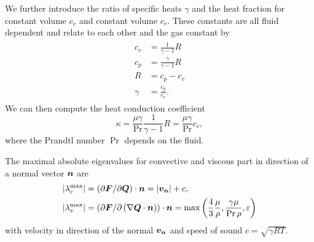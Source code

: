 We further introduce the ratio of specific heats $\gamma$ and the heat fraction for constant volume $c_v$ and constant volume $c_r$.
These constants are all fluid dependent and relate to each other and the gas constant by
\begin{align}
  \label{eq:fluid-constants}
  \begin{split}
  c_v &= \frac{1}{\gamma - 1} R \\
  c_p &= \frac{\gamma}{\gamma - 1} R\\
  R &= c_p - c_v\\
  \gamma &= \frac{c_p}{c_v}.
  \end{split}
\end{align}
We can then compute the heat conduction coefficient
\begin{equation}
  \label{eq:heat-conduction-coeff}
  \kappa = \frac{\mu \gamma}{\Pr} \frac{1}{\gamma - 1} R = \frac{\mu \gamma}{\Pr} c_v,
\end{equation}
where the Prandtl number $\Pr$ depends on the fluid.

The maximal absolute eigenvalues for convective and viscous part in direction of a normal vector $\bm{n}$ are
\begin{align}
  \begin{split}
    \maxConvEigen &= \left( \partial \bm{F}/\partial \bm{Q}\right) \cdot \normal = \vert \Qv_{\normal} \vert + c,\\
    \maxViscEigen &= \left( \partial \bm{F}/\partial \left( \nabla \bm{Q} \cdot \normal \right)\right) \cdot \normal =
    \max \left( \frac{4}{3} \frac{\mu}{\Qrho},
                        \frac{\gamma \mu}{\Pr \Qrho},
                        \diffCoeff \right)
  \end{split}
\end{align}
with velocity in direction of the normal $\bm{v}_{\bm{n}}$ and speed of sound $c = \sqrt{\gamma R T }$.


